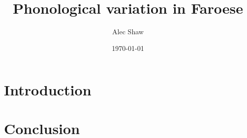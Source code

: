 \documentclass[a4paper]{article}
\title{Phonological variation in Faroese}
\author{Alec Shaw}
\date{\today}
\begin{document}
\maketitle

\section{Introduction}

\section{Conclusion}

\nocite{*}

\printbibliography
\end{document}
